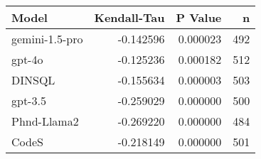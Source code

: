 \begin{tabular}{lrrr}
\toprule
Model & Kendall-Tau & P Value & n \\
\midrule
gemini-1.5-pro & -0.142596 & 0.000023 & 492 \\
gpt-4o & -0.125236 & 0.000182 & 512 \\
DINSQL & -0.155634 & 0.000003 & 503 \\
gpt-3.5 & -0.259029 & 0.000000 & 500 \\
Phnd-Llama2 & -0.269220 & 0.000000 & 484 \\
CodeS & -0.218149 & 0.000000 & 501 \\
\bottomrule
\end{tabular}
